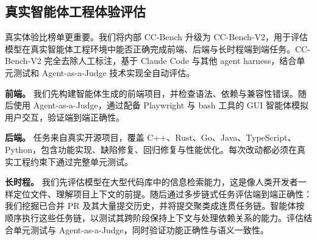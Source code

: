 \subsection{真实智能体工程体验评估}

真实体验比榜单更重要。我们将内部 CC-Bench 升级为 CC-Bench-V2，用于评估模型在真实智能体工程环境中能否正确完成前端、后端与长时程端到端任务。CC-Bench-V2 完全去除人工标注，基于 Claude Code 与其他 agent harness，结合单元测试和 Agent-as-a-Judge 技术实现全自动评估。

\textbf{前端。} 我们先构建智能体生成的前端项目，并检查语法、依赖与兼容性错误。随后使用 Agent-as-a-Judge，通过配备 Playwright 与 bash 工具的 GUI 智能体模拟用户交互，验证端到端正确性。

\textbf{后端。} 任务来自真实开源项目，覆盖 C++、Rust、Go、Java、TypeScript、Python，包含功能实现、缺陷修复、回归修复与性能优化。每次改动都必须在真实工程约束下通过完整单元测试。

\textbf{长时程。} 我们先评估模型在大型代码库中的信息检索能力，这是像人类开发者一样定位文件、理解项目上下文的前提。随后通过多步链式任务评估端到端正确性：我们挖掘已合并 PR 及其大量提交历史，并将提交聚类成连贯任务链。智能体按顺序执行这些任务链，以测试其跨阶段保持上下文与处理依赖关系的能力。评估结合单元测试与 Agent-as-a-Judge，同时验证功能正确性与语义一致性。

